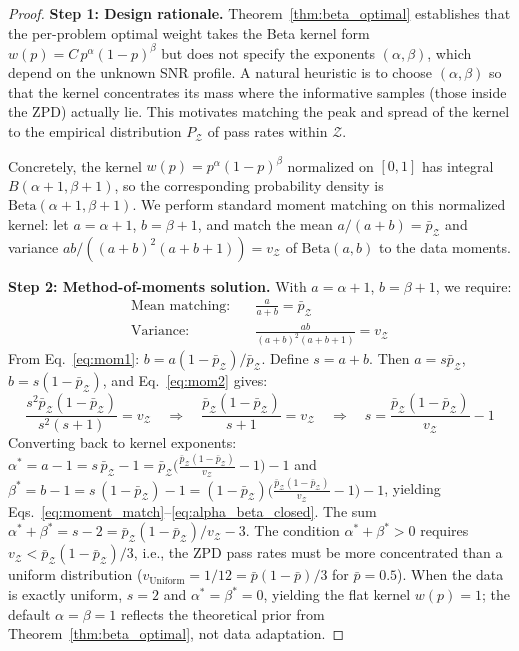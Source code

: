 \documentclass{article}
\begin{document}
\begin{proof}
\textbf{Step 1: Design rationale.}
Theorem~\ref{thm:beta_optimal} establishes that the per-problem optimal weight takes the Beta kernel form $w(p) = C\,p^\alpha(1-p)^\beta$ but does not specify the exponents $(\alpha,\beta)$, which depend on the unknown SNR profile. A natural heuristic is to choose $(\alpha,\beta)$ so that the kernel concentrates its mass where the informative samples (those inside the ZPD) actually lie. This motivates matching the peak and spread of the kernel to the empirical distribution $P_{\mathcal{Z}}$ of pass rates within $\mathcal{Z}$.

Concretely, the kernel $w(p)=p^\alpha(1-p)^\beta$ normalized on $[0,1]$ has integral $B(\alpha{+}1,\beta{+}1)$, so the corresponding probability density is $\mathrm{Beta}(\alpha{+}1,\beta{+}1)$. We perform standard moment matching on this normalized kernel: let $a=\alpha{+}1$, $b=\beta{+}1$, and match the mean $a/(a{+}b) = \bar{p}_{\mathcal{Z}}$ and variance $ab/((a{+}b)^2(a{+}b{+}1)) = v_{\mathcal{Z}}$ of $\mathrm{Beta}(a,b)$ to the data moments.

\textbf{Step 2: Method-of-moments solution.}
With $a = \alpha+1$, $b=\beta+1$, we require:
\begin{align}
  \text{Mean matching:}\quad& \frac{a}{a+b} = \bar{p}_{\mathcal{Z}} \label{eq:mom1}\\
  \text{Variance:}\quad& \frac{ab}{(a+b)^2(a+b+1)} = v_{\mathcal{Z}} \label{eq:mom2}
\end{align}
From Eq.~\eqref{eq:mom1}: $b = a(1-\bar{p}_{\mathcal{Z}})/\bar{p}_{\mathcal{Z}}$. Define $s = a + b$. Then $a = s\bar{p}_{\mathcal{Z}}$, $b = s(1-\bar{p}_{\mathcal{Z}})$, and Eq.~\eqref{eq:mom2} gives:
\begin{equation}
  \frac{s^2 \bar{p}_{\mathcal{Z}}(1-\bar{p}_{\mathcal{Z}})}{s^2(s+1)} = v_{\mathcal{Z}} \quad\Longrightarrow\quad \frac{\bar{p}_{\mathcal{Z}}(1-\bar{p}_{\mathcal{Z}})}{s + 1} = v_{\mathcal{Z}} \quad\Longrightarrow\quad s = \frac{\bar{p}_{\mathcal{Z}}(1-\bar{p}_{\mathcal{Z}})}{v_{\mathcal{Z}}} - 1
\end{equation}
Converting back to kernel exponents: $\alpha^* = a-1 = s\,\bar{p}_{\mathcal{Z}} - 1 = \bar{p}_{\mathcal{Z}}\bigl(\frac{\bar{p}_{\mathcal{Z}}(1-\bar{p}_{\mathcal{Z}})}{v_{\mathcal{Z}}} - 1\bigr) - 1$ and $\beta^* = b-1 = s\,(1-\bar{p}_{\mathcal{Z}}) - 1 = (1-\bar{p}_{\mathcal{Z}})\bigl(\frac{\bar{p}_{\mathcal{Z}}(1-\bar{p}_{\mathcal{Z}})}{v_{\mathcal{Z}}} - 1\bigr) - 1$, yielding Eqs.~\eqref{eq:moment_match}--\eqref{eq:alpha_beta_closed}. The sum $\alpha^*+\beta^* = s-2 = \bar{p}_{\mathcal{Z}}(1-\bar{p}_{\mathcal{Z}})/v_{\mathcal{Z}} - 3$. The condition $\alpha^*+\beta^* > 0$ requires $v_{\mathcal{Z}} < \bar{p}_{\mathcal{Z}}(1 - \bar{p}_{\mathcal{Z}})/3$, i.e., the ZPD pass rates must be more concentrated than a uniform distribution ($v_{\text{Uniform}} = 1/12 = \bar{p}(1-\bar{p})/3$ for $\bar{p}=0.5$). When the data is exactly uniform, $s=2$ and $\alpha^*=\beta^*=0$, yielding the flat kernel $w(p)=1$; the default $\alpha=\beta=1$ reflects the theoretical prior from Theorem~\ref{thm:beta_optimal}, not data adaptation.


\end{proof}
\end{document}
